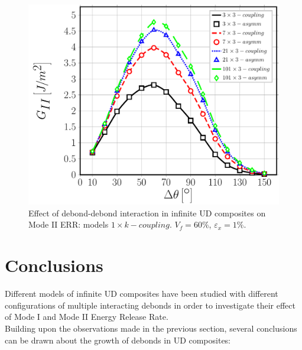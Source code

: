 \documentclass[smallextended]{svjour3}       %
\begin{document}
\begin{figure}[!h]
\centering
\includegraphics[width=\textwidth]{nxk-coupling-vf60-GII.pdf}
\caption{Effect of debond-debond interaction in infinite UD composites on Mode II ERR: models $1\times k-coupling$. $V_{f}=60\%$, $\varepsilon_{x}=1\%$.}\label{fig:nxkGII}
\end{figure}



\section{Conclusions}\label{sec:conclusions}

Different models of infinite UD composites have been studied with different configurations of multiple interacting debonds in order to investigate their effect of Mode I and Mode II Energy Release Rate.\\
Building upon the observations made in the previous section, several conclusions can be drawn about the growth of debonds in UD composites:
\end{document}
